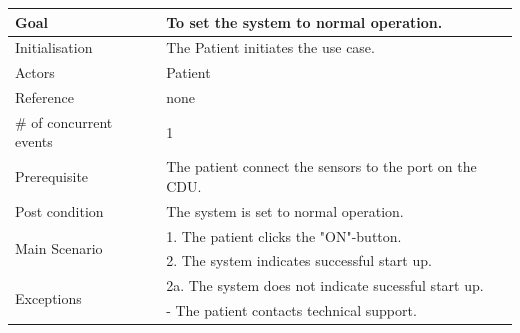 \begin{table}[H]
	\centering
	\begin{tabular}{|l|p{10cm}|}
	\hline
	Goal 							& To set the system to normal operation. \\ \hline
	Initialisation 					& The Patient initiates the use case. \\ \hline
	\multirow{1}{*}{Actors} 		& Patient \\ 
 \hline
	Reference 						& none \\ \hline
	\# of concurrent events 		& 1 \\ \hline
	Prerequisite  					& The patient connect the sensors to the port on the CDU. \\ \hline
	Post condition 					& The system is set to normal operation. \\ \hline
	\multirow{2}{*}{Main Scenario} 	& 1. The patient clicks the  "ON"-button. \\
	& 2. The system indicates successful start up.\\ \hline
	\multirow{2}{*}{Exceptions} & 2a. The system does not indicate sucessful start up. \\
	& - The patient contacts technical support. \\ \hline
	\end{tabular}
\end{table}

